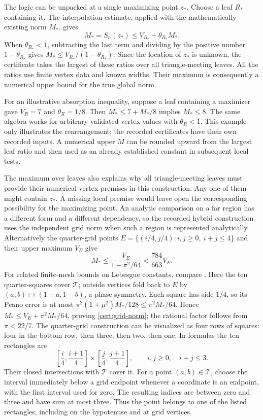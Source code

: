 The logic can be unpacked at a single maximizing point $z_*$. Choose
a leaf $R_*$ containing it. The interpolation estimate, applied with
the mathematically existing norm $M_*$, gives
\[
 M_*=S_n(z_*)\leq V_{R_*}+\theta_{R_*}M_*.
\]
When $\theta_{R_*}<1$, subtracting the last term and dividing by the
positive number $1-\theta_{R_*}$ gives
$M_*\leq V_{R_*}/(1-\theta_{R_*})$. Since the location of $z_*$
is unknown, the certificate takes the largest of these ratios over
all triangle-meeting leaves. All the ratios use finite vertex data
and known widths. Their maximum is consequently a numerical upper
bound for the true global norm.

For an illustrative absorption inequality, suppose a leaf containing
a maximizer gave $V_R=7$ and $\theta_R=1/8$. Then
$M_*\leq7+M_*/8$ implies $M_*\leq8$. The same algebra works for
arbitrary validated vertex values with $\theta_R<1$. This example
only illustrates the rearrangement; the recorded certificates have
their own recorded inputs. A numerical upper $M$ can be rounded
upward from the largest leaf ratio and then used as an already
established constant in subsequent local tests.

The maximum over leaves also explains why all triangle-meeting leaves
must provide their numerical vertex premises in this construction.
Any one of them might contain $z_*$. A missing local premise would
leave open the corresponding possibility for the maximizing point.
An analytic comparison on a far region has a different form and a
different dependency, so the recorded hybrid construction uses the
independent grid norm when such a region is represented analytically.
Alternatively the quarter-grid points
$E=\{(i/4,j/4):i,j\geq0,\ i+j\leq4\}$ and their upper maximum $V_E$
give
\begin{equation}\label{cert:grid-norm}
 M_*\leq\frac{V_E}{1-\pi^2/64}<\frac{784}{663}V_E.
\end{equation}
For related finite-mesh bounds on Lebesgue constants, compare
\cite[Proposition~2.2]{Mesh2024}. Here the ten quarter-squares cover
$\mathcal T$; outside vertices fold
back to $E$ by $(a,b)\mapsto(1-a,1-b)$, a phase symmetry.
Each square has side $1/4$, so its Peano error is at most
$\pi^2(1+\mu^2)M_*/128\leq\pi^2M_*/64$. Hence
$M_*\leq V_E+\pi^2M_*/64$, proving \eqref{cert:grid-norm}; the
rational factor follows from $\pi<22/7$.
The quarter-grid construction can be visualized as four rows of
squares: four in the bottom row, then three, then two, then one.
In formulas the ten rectangles are
\[
 \left[\frac i4,\frac{i+1}4\right]
 \times\left[\frac j4,\frac{j+1}4\right],
 \qquad i,j\geq0,\quad i+j\leq3.
\]
Their closed intersections with $\mathcal T$ cover it. For a point
$(a,b)\in\mathcal T$, choose the interval immediately below a grid
endpoint whenever a coordinate is an endpoint, with the first interval
used for zero. The resulting indices are between zero and three and
have sum at most three. Thus the point belongs to one of the listed
rectangles, including on the hypotenuse and at grid vertices.

